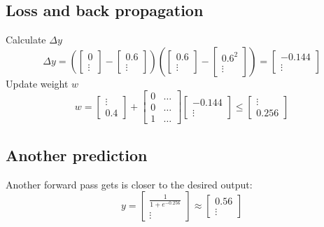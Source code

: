 \documentclass[10pt,a4paper]{article}
\begin{document}
\subsection{Loss and back propagation}
Calculate $\Delta{y}$
\begin{equation}
	\Delta{y} = (
	\begin{bmatrix}
		0 \\
		\vdots
	\end{bmatrix}
	-
	\begin{bmatrix}
		0.6 \\
		\vdots
	\end{bmatrix}
	)(
	\begin{bmatrix}
		0.6 \\
		\vdots
	\end{bmatrix}
	-
	\begin{bmatrix}
		0.6^2 \\
		\vdots
	\end{bmatrix}
	) =
	\begin{bmatrix}
		-0.144 \\
		\vdots
	\end{bmatrix}
\end{equation}
Update weight $w$
\begin{equation}
	w =
	\begin{bmatrix}
		\vdots \\
		0.4
	\end{bmatrix}
	+
	\begin{bmatrix}
		0 & \ldots \\
		0 & \ldots \\
		1 & \ldots
	\end{bmatrix}
	\begin{bmatrix}
		-0.144 \\
		\vdots
	\end{bmatrix}
	\leq
	\begin{bmatrix}
		\vdots \\
		0.256
	\end{bmatrix}
\end{equation}

\subsection{Another prediction}
Another forward pass gets is closer to the desired output:
\begin{equation}
	y =
	\begin{bmatrix}
		\frac{1}{1+e^{-0.256}} \\
		\vdots
	\end{bmatrix}
	\approx
	\begin{bmatrix}
		0.56 \\
		\vdots
	\end{bmatrix}
\end{equation}
\end{document}
